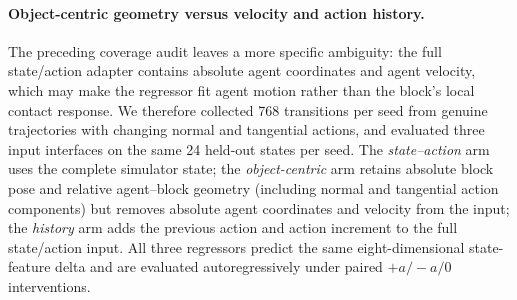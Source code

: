 \documentclass{article}
\begin{document}
\paragraph{Object-centric geometry versus velocity and action history.}
The preceding coverage audit leaves a more specific ambiguity: the full
state/action adapter contains absolute agent coordinates and agent velocity,
which may make the regressor fit agent motion rather than the block's local
contact response. We therefore collected 768 transitions per seed from
genuine trajectories with changing normal and tangential actions, and
evaluated three input interfaces on the same 24 held-out states per seed.
The \emph{state--action} arm uses the complete simulator state; the
\emph{object-centric} arm retains absolute block pose and relative
agent--block geometry (including normal and tangential action components) but
removes absolute agent coordinates and velocity from the input; the
\emph{history} arm adds the previous action and action increment to the full
state/action input. All three regressors predict the same eight-dimensional
state-feature delta and are evaluated autoregressively under paired
$+a/-a/0$ interventions.

\begin{table}[H]
\centering
\scriptsize
\setlength{\tabcolsep}{3pt}
\caption{Paired input-interface ablation over two independent seeds. Entries
are candidate minus the full state--action baseline; negative values improve
prediction. Intervals are case-bootstrap 95\% CIs with resampling within
seed clusters. The diagnostic uses privileged simulator state.}
\label{tab:supp-contact-input-ablation}
\end{table}
\end{document}
